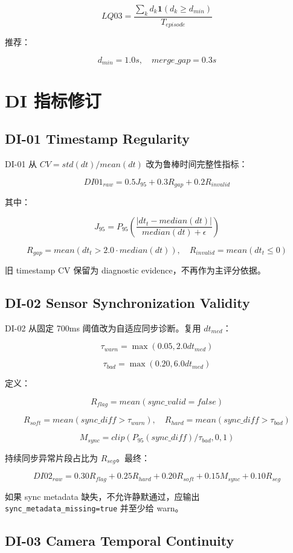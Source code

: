 \documentclass[UTF8,zihao=-4]{ctexart}
\newcommand{\Code}[1]{\texttt{#1}}
\begin{document}
\[
LQ03=\frac{\sum_k d_k\mathbf1(d_k\ge d_{min})}{T_{episode}}
\]

推荐：

\[
d_{min}=1.0s,\quad merge\_gap=0.3s
\]

\section{DI 指标修订}

\subsection{DI-01 Timestamp Regularity}

DI-01 从 \(CV=std(dt)/mean(dt)\) 改为鲁棒时间完整性指标：

\[
DI01_{raw}=0.5J_{95}+0.3R_{gap}+0.2R_{invalid}
\]

其中：

\[
J_{95}=P_{95}\left(\frac{|dt_t-median(dt)|}{median(dt)+\epsilon}\right)
\]

\[
R_{gap}=mean(dt_t>2.0\cdot median(dt)),\quad R_{invalid}=mean(dt_t\le0)
\]

旧 timestamp CV 保留为 diagnostic evidence，不再作为主评分依据。

\subsection{DI-02 Sensor Synchronization Validity}

DI-02 从固定 700ms 阈值改为自适应同步诊断。复用 \(dt_{med}\)：

\[
\tau_{warn}=\max(0.05,2.0dt_{med})
\]

\[
\tau_{bad}=\max(0.20,6.0dt_{med})
\]

定义：

\[
R_{flag}=mean(sync\_valid=false)
\]

\[
R_{soft}=mean(sync\_diff>\tau_{warn}),\quad R_{hard}=mean(sync\_diff>\tau_{bad})
\]

\[
M_{sync}=clip(P_{95}(sync\_diff)/\tau_{bad},0,1)
\]

持续同步异常片段占比为 \(R_{seg}\)。最终：

\[
DI02_{raw}=0.30R_{flag}+0.25R_{hard}+0.20R_{soft}+0.15M_{sync}+0.10R_{seg}
\]

如果 sync metadata 缺失，不允许静默通过，应输出 \Code{sync\_metadata\_missing=true} 并至少给 warn。

\subsection{DI-03 Camera Temporal Continuity}
\end{document}
